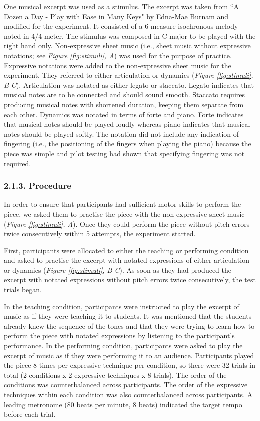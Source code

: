 \documentclass[
  english,
  man,floatsintext]{apa6}
\begin{document}
One musical excerpt was used as a stimulus. The excerpt was taken from ``A Dozen a Day - Play with Ease in Many Keys" by Edna-Mae Burnam and modified for the experiment. It consisted of a 6-measure isochronous melody noted in 4/4 meter. The stimulus was composed in C major to be played with the right hand only. Non-expressive sheet music (i.e., sheet music without expressive notations; see \emph{Figure \ref{fig:stimuli}, A}) was used for the purpose of practice. Expressive notations were added to the non-expressive sheet music for the experiment. They referred to either articulation or dynamics (\emph{Figure \ref{fig:stimuli}, B-C}). Articulation was notated as either legato or staccato. Legato indicates that musical notes are to be connected and should sound smooth. Staccato requires producing musical notes with shortened duration, keeping them separate from each other. Dynamics was notated in terms of forte and piano. Forte indicates that musical notes should be played loudly whereas piano indicates that musical notes should be played softly. The notation did not include any indication of fingering (i.e., the positioning of the fingers when playing the piano) because the piece was simple and pilot testing had shown that specifying fingering was not required.

\hypertarget{procedure}{%
\subsubsection{2.1.3. Procedure}\label{procedure}}

In order to ensure that participants had sufficient motor skills to perform the piece, we asked them to practise the piece with the non-expressive sheet music (\emph{Figure \ref{fig:stimuli}, A}). Once they could perform the piece without pitch errors twice consecutively within 5 attempts, the experiment started.

First, participants were allocated to either the teaching or performing condition and asked to practise the excerpt with notated expressions of either articulation or dynamics (\emph{Figure \ref{fig:stimuli}, B-C}). As soon as they had produced the excerpt with notated expressions without pitch errors twice consecutively, the test trials began.

In the teaching condition, participants were instructed to play the excerpt of music as if they were teaching it to students. It was mentioned that the students already knew the sequence of the tones and that they were trying to learn how to perform the piece with notated expressions by listening to the participant's performance. In the performing condition, participants were asked to play the excerpt of music as if they were performing it to an audience. Participants played the piece 8 times per expressive technique per condition, so there were 32 trials in total (2 conditions x 2 expressive techniques x 8 trials). The order of the conditions was counterbalanced across participants. The order of the expressive techniques within each condition was also counterbalanced across participants. A leading metronome (80 beats per minute, 8 beats) indicated the target tempo before each trial.
\end{document}
